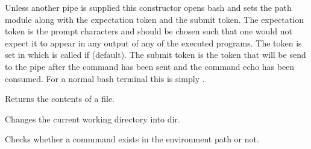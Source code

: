 \documentclass[letterpaper,10pt,english]{sphinxmanual}
\begin{document}
\begin{fulllineitems}
\label{api/shell_terminals:batchq.pipelines.shell.bash.BashTerminal}
Unless another pipe is supplied this constructor opens bash and
sets the path module along with the expectation token and the
submit token. The expectation token is the prompt characters and should be
chosen such that one would not expect it to appear in any output
of any of the executed programs. The token is set in
 which is called if  (default). The submit token is the token that will be send
to the pipe after the command has been sent and the command echo has been
consumed. For a normal bash terminal this is simply .

\begin{fulllineitems}
\label{api/shell_terminals:batchq.pipelines.shell.bash.BashTerminal.cat}
Returns the contents of a file.

\end{fulllineitems}


\begin{fulllineitems}
\label{api/shell_terminals:batchq.pipelines.shell.bash.BashTerminal.chdir}
Changes the current working directory into dir.

\end{fulllineitems}


\begin{fulllineitems}
\label{api/shell_terminals:batchq.pipelines.shell.bash.BashTerminal.command_exists}
Checks whether a commmand exists in the environment path or not.

\end{fulllineitems}



\end{fulllineitems}
\end{document}
